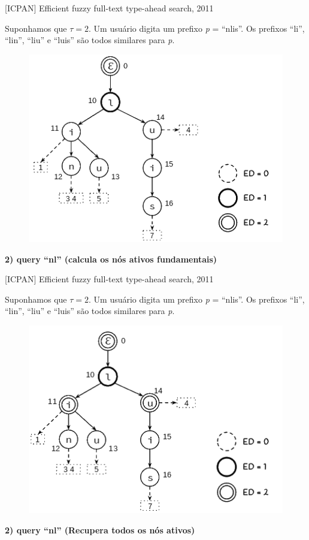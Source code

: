 \documentclass[11pt]{beamer}
\begin{document}
\begin{frame}{[ICPAN] Efficient fuzzy full-text type-ahead search, 2011}
    
    \small
    Suponhamos que $\tau = 2$. Um usuário digita um prefixo \textit{p} = ``nlis''. Os prefixos ``li'', ``lin'', ``liu'' e ``luis'' são todos similares para \textit{p}.

    \begin{figure}
      \includegraphics[scale=0.50]{pictures/ipcan_3.png}
      \centering
    \end{figure}
    
    \textbf{2) query ``nl'' (calcula os nós ativos fundamentais)}
    
\end{frame}

\begin{frame}{[ICPAN] Efficient fuzzy full-text type-ahead search, 2011}
    
    \small
    Suponhamos que $\tau = 2$. Um usuário digita um prefixo \textit{p} = ``nlis''. Os prefixos ``li'', ``lin'', ``liu'' e ``luis'' são todos similares para \textit{p}.

    \begin{figure}
      \includegraphics[scale=0.50]{pictures/ipcan_full_2.png}
      \centering
    \end{figure}
    
    \textbf{2) query ``nl'' (Recupera todos os nós ativos)}
    
\end{frame}
\end{document}
